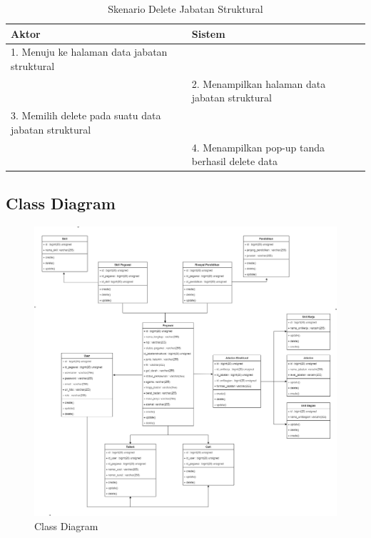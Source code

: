 \begin{enumerate}
\begin{itemize}
\end{itemize}

\begin{table}
	\caption{Skenario Delete Jabatan Struktural}
	\centering
	\begin{tabular}{ | p{55mm} | p{70mm}|}
		\hline 
		\textbf{Aktor} & \textbf{Sistem} \\
		\hline
		
		1.	Menuju ke halaman data jabatan struktural &  \\
		
		\hline
		
		&  2.	Menampilkan halaman data jabatan struktural\\
		
		\hline
		
		3. Memilih delete pada suatu data jabatan struktural& \\
		
		\hline
		
		& 4.	Menampilkan pop-up tanda berhasil delete data \\
		\hline
		
	\end{tabular}
\end{table}

\end{enumerate}

\subsection{Class Diagram}

\begin{figure}
	\centering
	\includegraphics[width=1\textwidth]
	{pics/diagram/classdiagram.png}
	\caption{Class Diagram}
	\label{fig:32}
\end{figure}


